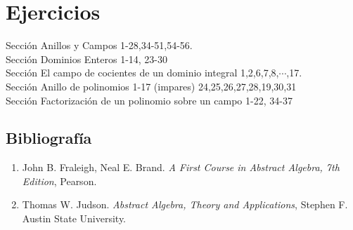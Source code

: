 
\usepackage{nopageno}  



	\section*{Ejercicios}
	\noindent
	Sección   Anillos y Campos 1-28,34-51,54-56. \\
	Sección  Dominios Enteros 1-14, 23-30 \\
	Sección   El campo de cocientes de un dominio integral 1,2,6,7,8,$\cdots$,17. \\
	Sección  Anillo de polinomios 1-17 (impares) 24,25,26,27,28,19,30,31 \\
	Sección  Factorización de un polinomio sobre un campo  1-22, 34-37 \\
	


\subsection*{Bibliografía}

\begin{enumerate}
	\item 	John B. Fraleigh, Neal E. Brand. \textit{A First Course in Abstract Algebra, 7th Edition},  Pearson.
	\item 	Thomas W. Judson. \textit{Abstract Algebra, Theory and Applications}, Stephen F. Austin State University.
\end{enumerate}


